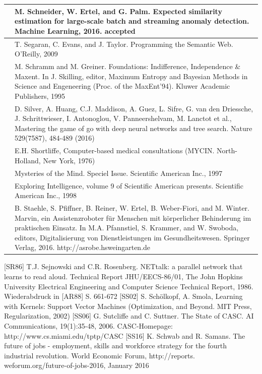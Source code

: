 \documentclass[10pt]{book}
\begin{document}
\begin{tabular}{|l|l|}
\hline [SEP16] & M. Schneider, W. Ertel, and G. Palm. Expected similarity estimation for large-scale batch and streaming anomaly detection. Machine Learning, 2016. accepted \\
\hline [SET09] & T. Segaran, C. Evans, and J. Taylor. Programming the Semantic Web. O'Reilly, 2009 \\
\hline [\cite{schramm1995foundations}] & M. Schramm and M. Greiner. Foundations: Indifference, Independence \& Maxent. In J. Skilling, editor, Maximum Entropy and Bayesian Methods in Science and Engeneering (Proc. of the MaxEnt'94). Kluwer Academic Publishers, 1995 \\
\hline [SHM+16] & D. Silver, A. Huang, C.J. Maddison, A. Guez, L. Sifre, G. van den Driessche, J. Schrittwieser, I. Antonoglou, V. Panneershelvam, M. Lanctot et al., Mastering the game of go with deep neural networks and tree search. Nature 529(7587), 484-489 (2016) \\
\hline [Sho76] & E.H. Shortliffe, Computer-based medical consultations (MYCIN. North-Holland, New York, 1976) \\
\hline [Spe97] & Mysteries of the Mind. Speciel Issue. Scientific American Inc., 1997 \\
\hline [Spe98] & Exploring Intelligence, volume 9 of Scientific American presents. Scientific American Inc., 1998 \\
\hline [SPR+16] & B. Staehle, S. Pfiffner, B. Reiner, W. Ertel, B. Weber-Fiori, and M. Winter. Marvin, ein Assistenzroboter f\"ur Menschen mit k\"orperlicher Behinderung im praktischen Einsatz. In M.A. Pfannstiel, S. Krammer, and W. Swoboda, editors, Digitalisierung von Dienstleistungen im Gesundheitswesen. Springer Verlag, 2016. http://asrobe.hsweingarten.de \\
\hline
\end{tabular}
[SR86] T.J. Sejnowski and C.R. Rosenberg. NETtalk: a parallel network that learns to read aloud. Technical Report JHU/EECS-86/01, The John Hopkins University Electrical Engineering and Computer Science Technical Report, 1986. Wiederabdruck in [AR88] S. 661-672
[SS02] S. Schölkopf, A. Smola, Learning with Kernels: Support Vector Machines (Optimization, and Beyond. MIT Press, Regularization, 2002)
[SS06] G. Sutcliffe and C. Suttner. The State of CASC. AI Communications, 19(1):35-48, 2006. CASC-Homepage: http://www.cs.miami.edu/tptp/CASC
[SS16] K. Schwab and R. Samans. The future of jobs - employment, skills and workforce strategy for the fourth industrial revolution. World Economic Forum, http://reports. weforum.org/future-of-jobs-2016, January 2016
\end{document}
